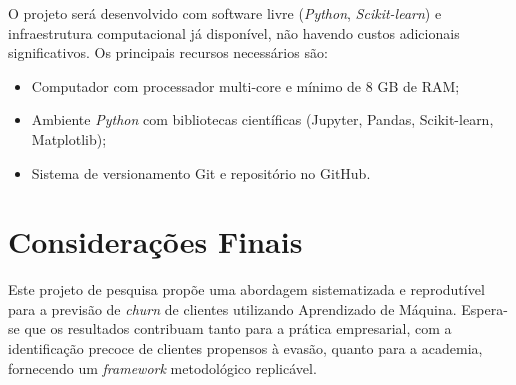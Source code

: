 \documentclass[
    article,
    12pt,
    oneside,
    a4paper,
    english,
    brazilian
    ]{abntex2}
\numberwithin{equation}{section}
\begin{document}
O projeto será desenvolvido com software livre (\textit{Python}, \textit{Scikit-learn}) e infraestrutura computacional já disponível, não havendo custos adicionais significativos. Os principais recursos necessários são:

\begin{itemize}
    \item Computador com processador multi-core e mínimo de 8 GB de RAM;
    \item Ambiente \textit{Python} com bibliotecas científicas (Jupyter, Pandas, Scikit-learn, Matplotlib);
    \item Sistema de versionamento Git e repositório no GitHub.
\end{itemize}

\section{Considerações Finais}

Este projeto de pesquisa propõe uma abordagem sistematizada e reprodutível para a previsão de \textit{churn} de clientes utilizando Aprendizado de Máquina. Espera-se que os resultados contribuam tanto para a prática empresarial, com a identificação precoce de clientes propensos à evasão, quanto para a academia, fornecendo um \textit{framework} metodológico replicável.



\end{document}
